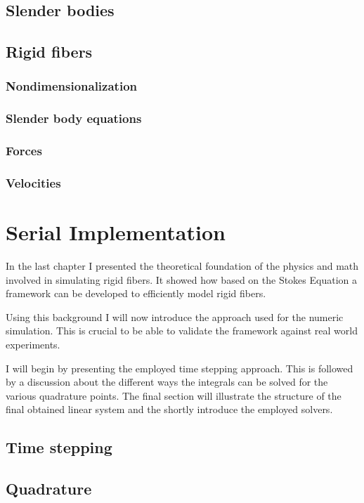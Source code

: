\documentclass[a4paper,11pt]{kth-mag}
\begin{document}
\section{Slender bodies}
\section{Rigid fibers}
\subsection{Nondimensionalization}
\subsection{Slender body equations}
\subsection{Forces}
\subsection{Velocities}

\chapter{Serial Implementation}
\label{cha:serial_implementation}

In the last chapter I presented the theoretical foundation of the physics and math involved in simulating rigid fibers. It showed how based on the Stokes Equation a framework can be developed to efficiently model rigid fibers.

Using this background I will now introduce the approach used for the numeric simulation. This is crucial to be able to validate the framework against real world experiments.

I will begin by presenting the employed time stepping approach. This is followed by a discussion about the different ways the integrals can be solved for the various quadrature points. The final section will illustrate the structure of the final obtained linear system and the shortly introduce the employed solvers.

\section{Time stepping}
\section{Quadrature}
\end{document}
